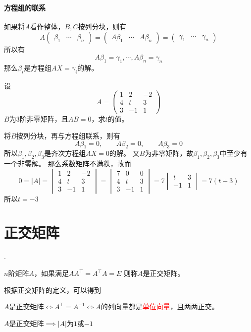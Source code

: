 \paragraph{方程组的联系} 如果将$A$看作整体，$B,C$按列分块，则有
\[
    A
    \begin{pmatrix}
        \beta_1 & \cdots & \beta_n
    \end{pmatrix}
    =
    \begin{pmatrix}
        A\beta_1 & \cdots & A\beta_n
    \end{pmatrix}
    =
    \begin{pmatrix}
        \gamma_1 & \cdots & \gamma_n
    \end{pmatrix}
\]
所以有
\[ A\beta_1 = \gamma_1, \cdots, A\beta_n = \gamma_n \]
那么$\beta_i$是方程组$AX=\gamma_i$的解。

\begin{example}
    设
    \[
        A =
        \begin{pmatrix}
            1 & 2  & -2 \\
            4 & t  & 3  \\
            3 & -1 & 1
        \end{pmatrix}
    \]
    $B$为$3$阶非零矩阵，且$AB=0$，求$t$的值。
\end{example}
\begin{solution}
    将$B$按列分块，再与方程组联系，则有
    \[ A\beta_1 = 0,\qquad A\beta_2 = 0,\qquad A\beta_3 = 0 \]
    所以$\beta_1,\beta_2,\beta_3$是齐次方程组$AX=0$的解。
    又$B$为非零矩阵，故$\beta_1,\beta_2,\beta_3$中至少有一个非零解。
    那么系数矩阵不满秩，故而
    \[
        0 = |A| =
        \begin{vmatrix}
            1 & 2  & -2 \\
            4 & t  & 3  \\
            3 & -1 & 1
        \end{vmatrix}
        =
        \begin{vmatrix}
            7 & 0  & 0 \\
            4 & t  & 3 \\
            3 & -1 & 1
        \end{vmatrix}
        =
        7\begin{vmatrix}
            t  & 3 \\
            -1 & 1
        \end{vmatrix}
        =
        7(t+3)
    \]
    所以$t=-3$
\end{solution}

\section{正交矩阵}
\label{sec:正交矩阵}
.
\begin{definition}
    $n$阶矩阵$A$，如果满足$AA^\intercal = A^\intercal A = E$
    则称$A$是正交矩阵。
\end{definition}
根据正交矩阵的定义，可以得到
\begin{theorem}
    $A$是正交矩阵$\iff A^\intercal = A^{-1} \iff A$的列向量都是\textcolor{red}{单位向量}，且两两正交。
\end{theorem}
\begin{theorem}
    $A$是正交矩阵$\implies |A|$为$1$或$-1$
\end{theorem}